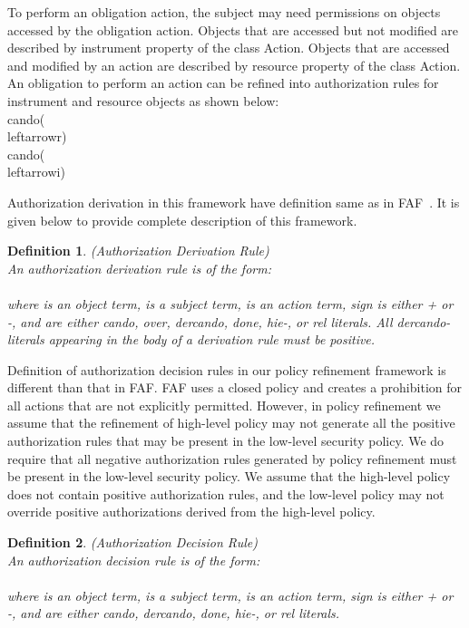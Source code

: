 \documentclass[12pt,journal,letterpaper,onecolumn]{IEEEtran}
\newtheorem{definition}{Definition}[section]
\begin{document}
To perform an obligation action, the subject  may need
permissions on objects accessed by the obligation action. Objects
that are accessed but not modified are described by {\ttfamily
instrument} property of the class {\ttfamily Action}. Objects that
are accessed and modified by an action are described by {\ttfamily
resource} property of the class {\ttfamily Action}. An obligation to
perform an action can be refined into authorization rules for
instrument and resource objects as shown below: \\
 {\ttfamily cando(\\leftarrowr)}\\
 {\ttfamily cando(\\leftarrowi)}


Authorization derivation in this framework have definition same as
in FAF~{\cite{Jajodia01}}. It is given below to provide complete
description of this framework.

\begin{definition}(Authorization Derivation Rule)\\
An {\em authorization derivation} rule is of the form:\\
\indent\indent{}\\
where  is an object term,  is a subject term,   is an
action term,  sign is either + or -, and  are
either cando, over, dercando, done, hie-, or rel literals. All
dercando-literals appearing in the body of a derivation rule must be
positive. \label{def:authorizationderivationrule}
\end{definition}

Definition of authorization decision rules in our policy refinement
framework is different than that in FAF. FAF uses a closed policy
and creates a prohibition for all actions that are not explicitly
permitted. However, in policy refinement we assume that the
refinement of high-level policy may not generate all the positive
authorization rules that may be present in the low-level security
policy. We do require that all negative authorization rules generated
by policy refinement must be present in the low-level security
policy. We assume that the high-level policy does not contain
positive authorization rules, and the low-level policy may not override
positive authorizations derived from the high-level policy.

\begin{definition}(Authorization Decision Rule)\\
An {\em authorization decision} rule is of the form:\\
\indent\indent{}\\
where  is an object term,  is a subject term,   is an
action term,  sign is either + or -, and  are
either cando, dercando, done, hie-, or rel literals.
\label{def:authorizationdecisionrule}
\end{definition}
\end{document}
